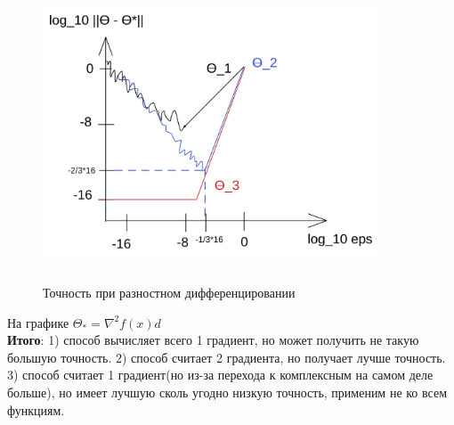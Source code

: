 \begin{figure}[hbt!]
    \centering
    \includegraphics[width=10cm, height=8cm]{images/kir_pic.png}
    \label{ris:im225}
    \caption{Точность при разностном дифференцировании}
\end{figure}
На графике $\Theta_* = \nabla^2 f(x)d$
\\

\textbf{Итого}: 1) способ вычисляет всего 1 градиент, но может получить не такую большую точность. 2) способ считает 2 градиента, но получает лучше точность. 3) способ считает 1 градиент(но из-за перехода к комплексным на самом деле больше), но имеет лучшую сколь угодно низкую точность, применим не ко всем функциям.

